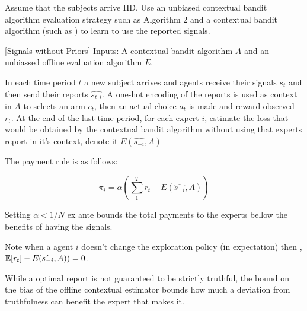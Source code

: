 


Assume that the subjects arrive IID. Use an unbiased contextual bandit algorithm evaluation strategy such as \cite{li2011unbiased}  Algorithm 2 and a contextual bandit algorithm (such as \cite{syrgkanis2016efficient}) to learn to use the reported signals. %

\begin{mech}\label{mech:bandit}[Signals without Priors]
Inputs: A contextual bandit algorithm $A$ and an unbiassed offline evaluation algorithm $E$.

In each time period $t$ a new subject arrives and agents receive their signals $s_t$ and then send their reports $\hat{s_{t,i}}$. A one-hot encoding of the reports is used as context in $A$ to selects an arm $c_t$, then an actual choice $a_t$ is made and reward observed $r_t$.
At the end of the last time period, for each expert $i$, estimate the loss that would be obtained by the contextual bandit algorithm without using that experts report in it's context, denote it $E(\hat{s_{-i}},A)$
 
The payment rule is as follows:

\[
    \pi_i =  \alpha (\sum_1^T r_t -  E(\hat{s_{-i}},A))
\]

Setting $\alpha<1/N$ ex ante bounds the total payments to the experts bellow the benefits of having the signals.

\end{mech}


Note when a agent $i$ doesn't change the exploration policy (in expectation) then , $ \operatorname*{\mathbb E}[r_t] -  E(\hat{s_{-i}},A)) =0  $.

While a optimal report is not guaranteed to be strictly truthful, the bound on the bias of the offline contextual estimator bounds how much a deviation from truthfulness can benefit the expert that makes it.


